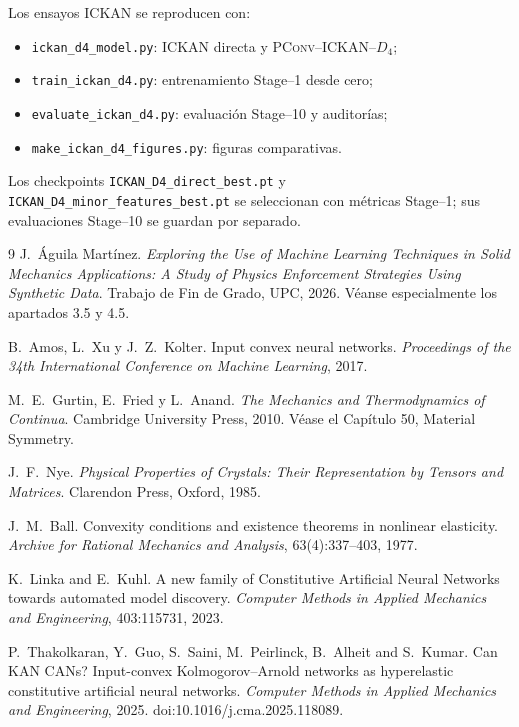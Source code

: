 \documentclass[11pt,a4paper]{article}
\newcommand{\Dfour}{\ensuremath{D_4}}
\newcommand{\PConvICKAN}{\textsc{PConv--ICKAN--}\Dfour}
\begin{document}
Los ensayos ICKAN se reproducen con:
\begin{itemize}
\item \texttt{ickan\_d4\_model.py}: ICKAN directa y \PConvICKAN{};
\item \texttt{train\_ickan\_d4.py}: entrenamiento Stage--1 desde cero;
\item \texttt{evaluate\_ickan\_d4.py}: evaluación Stage--10 y auditorías;
\item \texttt{make\_ickan\_d4\_figures.py}: figuras comparativas.
\end{itemize}
Los checkpoints \texttt{ICKAN\_D4\_direct\_best.pt} y
\texttt{ICKAN\_D4\_minor\_features\_best.pt} se seleccionan con métricas
Stage--1; sus evaluaciones Stage--10 se guardan por separado.

\begin{thebibliography}{9}
\footnotesize
{}
J.~Águila Martínez. \emph{Exploring the Use of Machine Learning Techniques in
Solid Mechanics Applications: A Study of Physics Enforcement Strategies Using
Synthetic Data}. Trabajo de Fin de Grado, UPC, 2026. Véanse especialmente los
apartados 3.5 y 4.5.

B.~Amos, L.~Xu y J.~Z.~Kolter. Input convex neural networks.
\emph{Proceedings of the 34th International Conference on Machine Learning},
2017.

M.~E.~Gurtin, E.~Fried y L.~Anand. \emph{The Mechanics and Thermodynamics of
Continua}. Cambridge University Press, 2010. Véase el Capítulo 50,
Material Symmetry.

J.~F.~Nye. \emph{Physical Properties of Crystals: Their Representation by
Tensors and Matrices}. Clarendon Press, Oxford, 1985.

J.~M.~Ball. Convexity conditions and existence theorems in nonlinear
elasticity. \emph{Archive for Rational Mechanics and Analysis},
63(4):337--403, 1977.

K.~Linka and E.~Kuhl. A new family of Constitutive Artificial Neural Networks
towards automated model discovery. \emph{Computer Methods in Applied Mechanics
and Engineering}, 403:115731, 2023.

P.~Thakolkaran, Y.~Guo, S.~Saini, M.~Peirlinck, B.~Alheit and S.~Kumar.
Can KAN CANs? Input-convex Kolmogorov--Arnold networks as hyperelastic
constitutive artificial neural networks. \emph{Computer Methods in Applied
Mechanics and Engineering}, 2025. doi:10.1016/j.cma.2025.118089.
\end{thebibliography}
\end{document}
